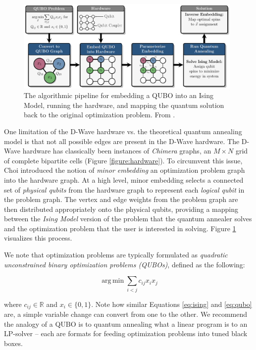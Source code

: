 \documentclass{sig-alternate-05-2015}
\DeclareMathOperator*{\argmin}{arg\,min}
\begin{document}
\begin{figure}[!h]
\centering
\includegraphics[width=0.98\textwidth]{images/pipeline}
\caption{The algorithmic pipeline for embedding a QUBO into an Ising Model, running the hardware, and mapping the quantum solution back to the original optimization problem. From \cite{goodrich2016graph}.}
\label{figure:pipeline}
\end{figure}

One limitation of the D-Wave hardware vs. the theoretical quantum annealing model is that not all possible edges are present in the D-Wave hardware. The D-Wave hardware has classically been instances of \emph{Chimera} graphs, an $M \times N$ grid of complete bipartite cells (Figure \ref{figure:hardware}). To circumvent this issue, Choi \cite{choi2011minor} introduced the notion of \emph{minor embedding} an optimization problem graph into the hardware graph. At a high level, minor embedding selects a connected set of \emph{physical qubits} from the hardware graph to represent each \emph{logical qubit} in the problem graph. The vertex and edge weights from the problem graph are then
distributed appropriately onto the physical qubits, providing a mapping between the \emph{Ising Model} version of the problem that the quantum annealer solves and the optimization problem that the user is interested in solving. Figure \ref{figure:pipeline} visualizes this process.

We note that optimization problems are typically formulated as \emph{quadratic unconstrained binary optimization problems (QUBOs)}, defined as the following:

\begin{equation}
\label{eq:qubo}
    \displaystyle \argmin \sum_{i < j} c_{ij} x_i x_j
\end{equation}

where $c_{ij} \in \mathbb{R}$ and $x_i \in \{0, 1\}$. Note how similar Equations \ref{eq:ising} and \ref{eq:qubo} are, a simple variable change can convert from one to the other. We recommend the analogy of a QUBO is to quantum annealing what a linear program is to an LP-solver -- each are formats for feeding optimization problems into tuned black boxes.
\end{document}
